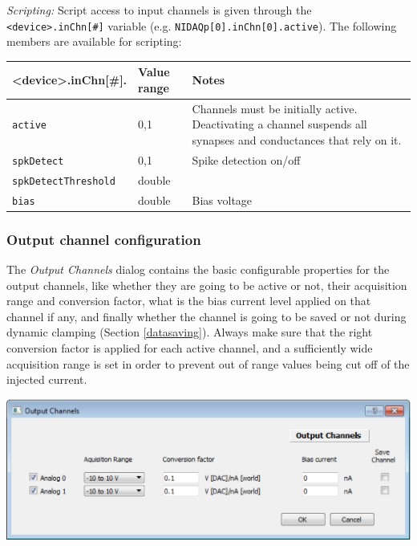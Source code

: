 \documentclass{article}
\begin{document}
\noindent
\emph{Scripting:} Script access to input channels is given through the \texttt{<device>.inChn[\#]} variable
(e.g. \texttt{NIDAQp[0].inChn[0].active}).
The following members are available for scripting: \\
\begin{tabularx}{\linewidth}{|ll|X|}
	\hline
	{\bf \textless{}device\textgreater.inChn[\#].\textvisiblespace} & {\bf Value range} & {\bf Notes} \\
	\hline
	\texttt{active} & 0,1 & Channels must be initially active. Deactivating a channel suspends all
	  synapses and conductances that rely on it. \\
	\texttt{spkDetect} & 0,1 & Spike detection on/off \\
	\texttt{spkDetectThreshold} & double & \\
	\texttt{bias} & double & Bias voltage \\
	\hline
\end{tabularx}


\subsubsection{Output channel configuration} \label{outchnconfig}

The \emph{Output Channels} dialog contains the basic configurable properties
for the output channels, like whether they are going to be active or not,
their acquisition range and conversion factor, what is the bias current
level applied on that channel if any, and finally whether the channel is
going to be saved or not during dynamic clamping (Section
\ref{datasaving}). Always make sure that the right conversion factor is
applied for each active channel, and a sufficiently wide acquisition range
is set in order to prevent out of range values being cut off of the
injected current.

\noindent
\parbox{\textwidth}{
	\includegraphics[scale=0.5]{outputChnDialog}
} \\[0.2cm]
\end{document}
